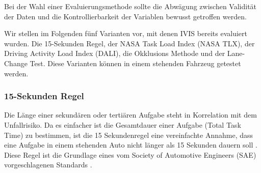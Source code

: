 Bei der Wahl einer Evaluierungsmethode sollte die Abwägung zwischen Validität der Daten und die Kontrollierbarkeit der Variablen bewusst getroffen werden.

Wir stellen im Folgenden fünf Varianten vor, mit denen IVIS bereits evaluiert wurden. Die 15-Sekunden Regel, der NASA Task Load Index (NASA TLX), der Driving Activity Load Index (DALI), die Okklusions Methode und der Lane-Change Test. 
Diese Varianten können in einem stehenden Fahrzeug getestet werden. 

\subsubsection{15-Sekunden Regel}
Die Länge einer sekundären oder tertiären Aufgabe steht in Korrelation mit dem Unfallrisiko. Da es einfacher ist die Gesamtdauer einer Aufgabe (Total Task Time) zu bestimmen, ist die 15 Sekundenregel eine vereinfachte Annahme, dass eine Aufgabe in einem stehenden Auto nicht länger als 15 Sekunden dauern soll \citep{green199915}. 
Diese Regel ist die Grundlage eines vom Society of Automotive Engineers (SAE) vorgeschlagenen Standards \citep{green1999sae}. 

